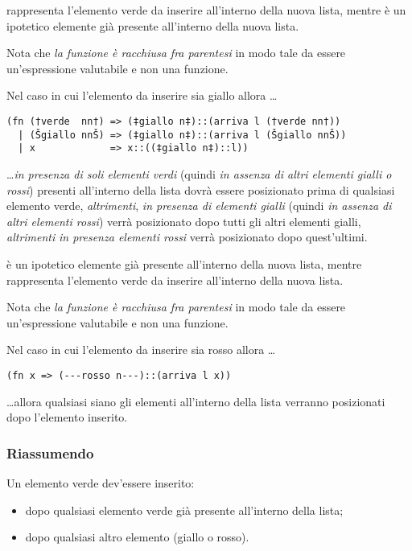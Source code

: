  rappresenta l'elemento verde da inserire all'interno della nuova lista, mentre  è un ipotetico elemente già presente all'interno della nuova lista.

Nota che \emph{la funzione è racchiusa fra parentesi} in modo tale da essere un'espressione valutabile e non una funzione.

\medskip
Nel caso in cui l'elemento da inserire sia giallo  allora \sml{=>} \dots
\begin{lstlisting}[style = SML, frame = none]
(fn (†verde  nn†) => (‡giallo n‡)::(arriva l (†verde nn†))
  | (Šgiallo nnŠ) => (‡giallo n‡)::(arriva l (Šgiallo nnŠ))
  | x             => x::((‡giallo n‡)::l))
\end{lstlisting}
\dots \emph{in presenza di soli elementi verdi} (quindi \emph{in assenza di altri elementi gialli o rossi}) presenti all'interno della lista dovrà essere posizionato prima di qualsiasi elemento verde, %
\emph{altrimenti}, \emph{in presenza di elementi gialli} (quindi \emph{in assenza di altri elementi rossi}) verrà posizionato dopo tutti gli altri elementi gialli, %
\emph{altrimenti} \emph{in presenza elementi rossi} verrà posizionato dopo quest'ultimi.

 è un ipotetico elemente già presente all'interno della nuova lista, mentre  rappresenta l'elemento verde da inserire all'interno della nuova lista.

Nota che \emph{la funzione è racchiusa fra parentesi} in modo tale da essere un'espressione valutabile e non una funzione.

\medskip
Nel caso in cui l'elemento da inserire sia rosso  allora \sml{=>} \dots
\begin{lstlisting}[style = SML, frame = none]
(fn x => (---rosso n---)::(arriva l x))
\end{lstlisting}
\dots allora qualsiasi siano gli elementi all'interno della lista verranno posizionati dopo l'elemento inserito.

\subsubsection{Riassumendo}

Un elemento verde dev'essere inserito:

\begin{itemize}
	\item dopo qualsiasi elemento verde già presente all'interno della lista;
	\item dopo qualsiasi altro elemento (giallo o rosso).
\end{itemize}

